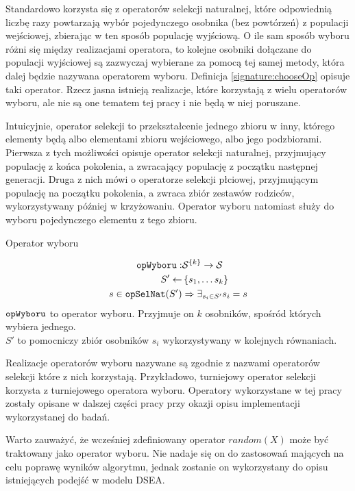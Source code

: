 \documentclass[./FM_mgr.tex]{subfiles}
\begin{document}
Standardowo korzysta się z operatorów selekcji naturalnej, które odpowiednią liczbę razy powtarzają wybór pojedynczego osobnika (bez powtórzeń) z populacji wejściowej, zbierając w ten sposób populację wyjściową. 
O ile sam sposób wyboru różni się między realizacjami operatora, to kolejne osobniki dołączane do populacji wyjściowej są zazwyczaj wybierane za pomocą tej samej metody, która dalej będzie nazywana operatorem wyboru.
Definicja \ref{signature:chooseOp} opisuje taki operator.
Rzecz jasna istnieją realizacje, które korzystają z wielu operatorów wyboru, ale nie są one tematem tej pracy i nie będą w niej poruszane.

Intuicyjnie, operator selekcji to przekształcenie jednego zbioru w inny, którego elementy będą albo elementami zbioru wejściowego, albo jego podzbiorami.
Pierwsza z tych możliwości opisuje operator selekcji naturalnej, przyjmujący populację z końca pokolenia, a zwracający populację z początku następnej generacji.
Druga z nich mówi o operatorze selekcji płciowej, przyjmującym populację na początku pokolenia, a zwraca zbiór zestawów rodziców, wykorzystywany później w krzyżowaniu.
Operator wyboru natomiast służy do wyboru pojedynczego elementu z tego zbioru.

\begin{signature}
	\caption{Operator wyboru \label{signature:chooseOp}}
	\begin{align}
	\mathtt{opWyboru}: &{\mathcal{S}}^{ \{ k \}} \rightarrow \mathcal{S} \\
	S' \gets &\left\{ s_1, \ldots s_k \right\} \\
	s \in \mathtt{opSelNat}(S') &\Rightarrow \exists_{s_i \in S'}  s_i = s
	\end{align}
	$\mathtt{opWyboru}$ to operator wyboru.
	Przyjmuje on $k$ osobników, spośród których wybiera jednego. \\
	$S'$ to pomocniczy zbiór osobników $s_i$ wykorzystywany w kolejnych równaniach.
\end{signature}

Realizacje operatorów wyboru nazywane są zgodnie z nazwami operatorów selekcji które z nich korzystają.
Przykładowo, turniejowy operator selekcji korzysta z turniejowego operatora wyboru.
Operatory wykorzystane w tej pracy zostały opisane w dalszej części pracy przy okazji opisu implementacji wykorzystanej do badań.

Warto zauważyć, że wcześniej zdefiniowany operator $random(X)$ może być traktowany jako operator wyboru.
Nie nadaje się on do zastosowań mających na celu poprawę wyników algorytmu, jednak zostanie on wykorzystany do opisu istniejących podejść w modelu DSEA.
\end{document}
